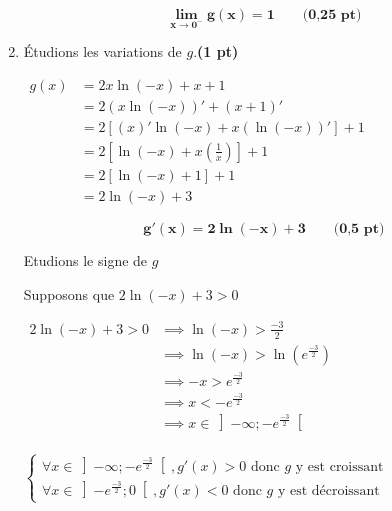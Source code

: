 \documentclass[12pt,a4paper]{article}
\begin{document}
\begin{enumerate}
          \begin{resultbox}
              \[
                  \mathbf{\lim\limits_{x\to 0^{-}}g(x) = 1}\quad\quad\textbf{(0,25 pt)}
              \]
          \end{resultbox}
    \item Étudions les variations de \( g \).\hfill \textbf{(1 pt)}

          \(
          \begin{aligned}
              g(x) & = 2x \ln(-x) + x + 1                                  \\
                   & = 2(x \ln(-x))' + (x + 1)'                            \\
                   & = 2\left[(x)'\ln(-x)+x(\ln(-x))'\right] + 1           \\
                   & = 2\left[\ln(-x)+x\left(\frac{1}{x}\right)\right] + 1 \\
                   & = 2\left[\ln(-x)+1\right] + 1                         \\
                   & = 2\ln(-x)+ 3
          \end{aligned}
          \)

          \begin{resultbox}
              \[
                  \mathbf{g'(x)=2\ln(-x)+ 3}\quad\quad\textbf{(0,5 pt)}
              \]
          \end{resultbox}

          Etudions le signe de \(g\)

          Supposons que \( 2\ln(-x)+ 3 > 0 \)

          \(
          \begin{aligned}
              2\ln(-x)+ 3 > 0 & \implies \ln(-x)> \frac{-3}{2}                       \\
                              & \implies \ln(-x)> \ln\left(e^{\frac{-3}{2}}\right)   \\
                              & \implies -x> e^{\frac{-3}{2}}                        \\
                              & \implies x< -e^{\frac{-3}{2}}                        \\
                              & \implies x\in \left]-\infty;-e^{\frac{-3}{2}}\right[ \\
          \end{aligned}
          \)

          \(
          \begin{cases}
              \forall x \in \left]-\infty;-e^{\frac{-3}{2}}\right[, g'(x)>0  \text{ donc $g$ y est croissant} \\
                  \forall x \in \left]-e^{\frac{-3}{2}};0\right[, g'(x)<0 \text{ donc $g$ y est décroissant}
          \end{cases}
          \)


\end{enumerate}
\end{document}
